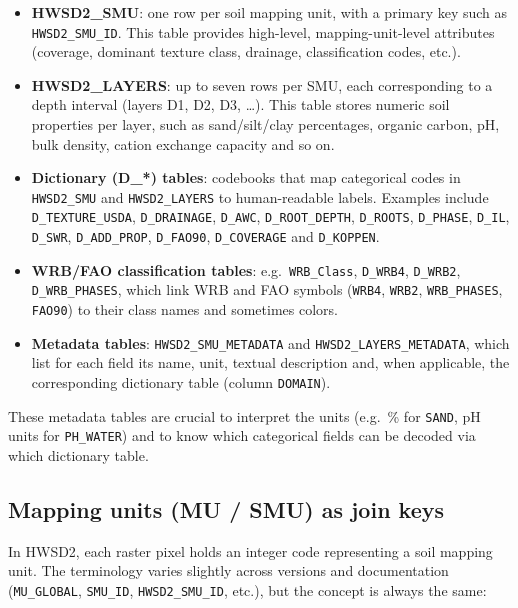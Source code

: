 \begin{itemize}
    \item \textbf{HWSD2\_SMU}: one row per soil mapping unit, with a primary key
    such as \texttt{HWSD2\_SMU\_ID}. This table provides high-level,
    mapping-unit-level attributes (coverage, dominant texture class, drainage,
    classification codes, etc.).
    \item \textbf{HWSD2\_LAYERS}: up to seven rows per SMU, each corresponding
    to a depth interval (layers D1, D2, D3, \dots). This table stores numeric
    soil properties per layer, such as sand/silt/clay percentages, organic
    carbon, pH, bulk density, cation exchange capacity and so on.
    \item \textbf{Dictionary (D\_*) tables}: codebooks that map categorical
    codes in \texttt{HWSD2\_SMU} and \texttt{HWSD2\_LAYERS} to human-readable
    labels. Examples include \texttt{D\_TEXTURE\_USDA}, \texttt{D\_DRAINAGE},
    \texttt{D\_AWC}, \texttt{D\_ROOT\_DEPTH}, \texttt{D\_ROOTS},
    \texttt{D\_PHASE}, \texttt{D\_IL}, \texttt{D\_SWR}, \texttt{D\_ADD\_PROP},
    \texttt{D\_FAO90}, \texttt{D\_COVERAGE} and \texttt{D\_KOPPEN}.
    \item \textbf{WRB/FAO classification tables}: e.g.\ \texttt{WRB\_Class},
    \texttt{D\_WRB4}, \texttt{D\_WRB2}, \texttt{D\_WRB\_PHASES}, which link WRB
    and FAO symbols (\texttt{WRB4}, \texttt{WRB2}, \texttt{WRB\_PHASES},
    \texttt{FAO90}) to their class names and sometimes colors.
    \item \textbf{Metadata tables}: \texttt{HWSD2\_SMU\_METADATA} and
    \texttt{HWSD2\_LAYERS\_METADATA}, which list for each field its name,
    unit, textual description and, when applicable, the corresponding
    dictionary table (column \texttt{DOMAIN}).
\end{itemize}

These metadata tables are crucial to interpret the units (e.g.\ \% for
\texttt{SAND}, pH units for \texttt{PH\_WATER}) and to know which categorical
fields can be decoded via which dictionary table.

\subsection{Mapping units (MU / SMU) as join keys}

In HWSD2, each raster pixel holds an integer code representing a soil mapping
unit. The terminology varies slightly across versions and documentation
(\texttt{MU\_GLOBAL}, \texttt{SMU\_ID}, \texttt{HWSD2\_SMU\_ID}, etc.), but the
concept is always the same:

